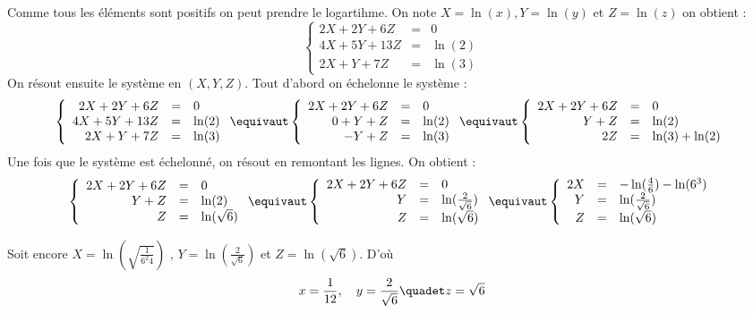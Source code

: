 \documentclass[a4paper, 11pt,reqno]{article}
\begin{document}
\begin{correction}
Comme tous les éléments sont positifs on peut prendre le logartihme. 
On note $X= \ln(x), Y=\ln(y)$ et $Z=\ln(z)$ on obtient : 
$$\left\{ \begin{array}{ccc}
2X +2Y+6Z& =& 0\\
4X+5Y+13Z& =& \ln(2) \\
2X+Y+7Z & =& \ln(3)
\end{array}\right. $$
On résout ensuite le système en $(X,Y,Z)$. Tout d'abord on échelonne le système : 
$$\left\{ \begin{array}{rcl}
2X +2Y+6Z& =& 0\\
4X+5Y+13Z& =& \ln(2) \\
2X+Y+7Z & =& \ln(3)
\end{array}\right. \equivaut 
\left\{ \begin{array}{rcl}
2X +2Y+6Z& =& 0\\
0+Y+Z& =& \ln(2) \\
-Y+Z & =& \ln(3)
\end{array}\right. \equivaut 
\left\{ \begin{array}{rcl}
2X +2Y+6Z& =& 0\\
Y+Z& =& \ln(2) \\
2 Z & =& \ln(3) +\ln(2)
\end{array}\right.$$
Une fois que le système est échelonné, on résout en remontant les lignes. 
On obtient : 
$$\left\{ \begin{array}{rcl}
2X +2Y+6Z& =& 0\\
Y+Z& =& \ln(2) \\
Z & =& \ln(\sqrt{6})
\end{array}\right. \equivaut 
\left\{ \begin{array}{rcl}
2X +2Y+6Z& =& 0\\
Y& =& \ln(\frac{2}{\sqrt{6}}) \\
Z & =& \ln(\sqrt{6})
\end{array}\right. \equivaut 
\left\{ \begin{array}{rcl}
2X & =& -\ln(\frac{4}{6})  -\ln(6^3)\\
Y& =& \ln(\frac{2}{\sqrt{6}}) \\
Z & =& \ln(\sqrt{6})
\end{array}\right.
$$


Soit encore  $X= \ln( \sqrt{\frac{1}{6^2 4}}) $ , $Y = \ln(\frac{2}{\sqrt{6}}) $ et $Z= \ln(\sqrt{6})$. 
D'où $$x= \frac{1}{12}, \quad  y = \frac{2}{\sqrt{6}}  \quadet z= \sqrt{6}$$







\end{correction}
\end{document}
